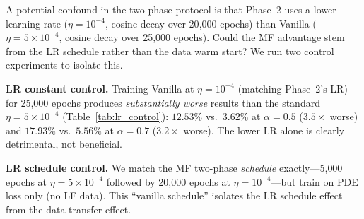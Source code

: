 \documentclass[preprint,12pt]{elsarticle}
\newcommand{\Ncol}{N_{\mathrm{col}}}
\begin{document}
A potential confound in the two-phase protocol is that Phase~2 uses a lower learning rate ($\eta = 10^{-4}$, cosine decay over 20{,}000 epochs) than Vanilla ($\eta = 5 \times 10^{-4}$, cosine decay over 25{,}000 epochs). Could the MF advantage stem from the LR schedule rather than the data warm start? We run two control experiments to isolate this.

\textbf{LR constant control.} Training Vanilla at $\eta = 10^{-4}$ (matching Phase~2's LR) for 25{,}000 epochs produces \emph{substantially worse} results than the standard $\eta = 5 \times 10^{-4}$ (Table~\ref{tab:lr_control}): $12.53\%$ vs.\ $3.62\%$ at $\alpha = 0.5$ ($3.5\times$ worse) and $17.93\%$ vs.\ $5.56\%$ at $\alpha = 0.7$ ($3.2\times$ worse). The lower LR alone is clearly detrimental, not beneficial.

\textbf{LR schedule control.} We match the MF two-phase \emph{schedule} exactly---5{,}000 epochs at $\eta = 5 \times 10^{-4}$ followed by 20{,}000 epochs at $\eta = 10^{-4}$---but train on PDE loss only (no LF data). This ``vanilla schedule'' isolates the LR schedule effect from the data transfer effect.

\begin{table}[t]
\centering
\caption{LR schedule control (5 seeds, $\Ncol = 100$). Three conditions: (1)~Vanilla standard (25k epochs at $\eta = 5 \times 10^{-4}$), (2)~Vanilla schedule (5k at $5 \times 10^{-4}$ then 20k at $10^{-4}$), (3)~MF two-phase (5k data + 20k physics). The schedule alone \emph{hurts}; MF advantage is from data transfer only.}
\label{tab:lr_control}
\end{table}
\end{document}
